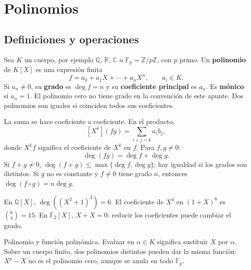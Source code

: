 \chapter{Polinomios}
\section{Definiciones y operaciones}
\begin{definicion}
Sea $K$ un cuerpo, por ejemplo $\mathbb Q$, $\mathbb R$, $\mathbb C$
o $\mathbb F_p=\mathbb Z/p\mathbb Z$, con $p$ primo.
Un \textbf{polinomio} de $K[X]$ es una expresión finita
\[
f=a_0+a_1X+\cdots+a_nX^n,\qquad a_i\in K.
\]
Si $a_n\neq0$, su \textbf{grado} es $\deg f=n$ y su
\textbf{coeficiente principal} es $a_n$. Es \textbf{mónico} si $a_n=1$.
El polinomio cero no tiene grado en la convención de este apunte.
Dos polinomios son iguales si coinciden todos sus coeficientes.
\end{definicion}
\begin{proposicion}[{title={Operaciones y grados}}]
La suma se hace coeficiente a coeficiente. En el producto,
\[
[X^k](fg)=\sum_{i+j=k}a_i b_j,
\]
donde $X^kf$ significa el coeficiente de $X^k$ en $f$.
Para $f,g\neq0$:
\[
\deg(fg)=\deg f+\deg g.
\]
Si $f+g\neq0$, $\deg(f+g)\leq\max\{\deg f,\deg g\}$;
hay igualdad si los grados son distintos. Si $g$ no es constante y
$f\neq0$ tiene grado $n$, entonces $\deg(f\circ g)=n\deg g$.
\end{proposicion}
\begin{ejemplo}
En $\mathbb Q[X]$, $\deg((X^2+1)^3)=6$.
El coeficiente de $X^4$ en $(1+X)^6$ es $\binom64=15$.
En $\mathbb F_2[X]$, $X+X=0$: reducir los coeficientes puede cambiar el grado.
\end{ejemplo}
\begin{nota}{Polinomio y función polinómica.}
Evaluar en $\alpha\in K$ significa sustituir $X$ por $\alpha$.
Sobre un cuerpo finito, dos polinomios distintos pueden dar la misma función:
$X^p-X$ no es el polinomio cero, aunque se anula en todo $\mathbb F_p$.
\end{nota}
